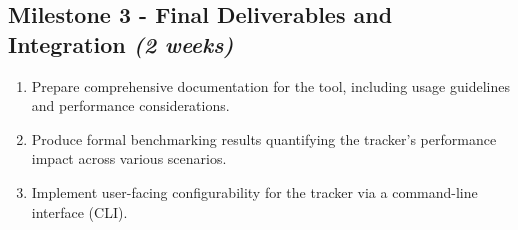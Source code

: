 \subsection*{Milestone 3 - Final Deliverables and Integration \hfill \textit{(2 weeks)}}
    \begin{enumerate}
        \item Prepare comprehensive documentation for the tool, including usage guidelines and performance considerations.
        \item Produce formal benchmarking results quantifying the tracker's performance impact across various scenarios.
        \item Implement user-facing configurability for the tracker via a command-line interface (CLI).
    \end{enumerate}